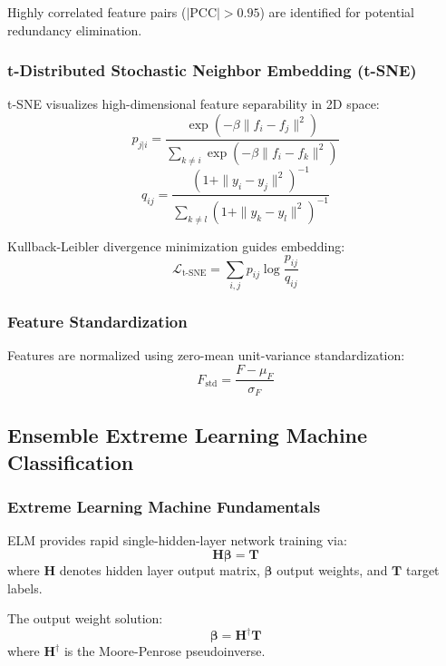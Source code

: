 \documentclass[11pt,a4paper]{article}
\begin{document}
Highly correlated feature pairs ($|\text{PCC}| > 0.95$) are identified for potential redundancy elimination.

\subsubsection{t-Distributed Stochastic Neighbor Embedding (t-SNE)}
t-SNE visualizes high-dimensional feature separability in 2D space:
\begin{equation}
p_{j|i} = \frac{\exp(-\beta \|f_i - f_j\|^2)}{\sum_{k \neq i}\exp(-\beta \|f_i - f_k\|^2)}
\end{equation}
\begin{equation}
q_{ij} = \frac{(1 + \|y_i - y_j\|^2)^{-1}}{\sum_{k \neq l}(1 + \|y_k - y_l\|^2)^{-1}}
\end{equation}

Kullback-Leibler divergence minimization guides embedding:
\begin{equation}
\mathcal{L}_{\text{t-SNE}} = \sum_{i,j} p_{ij} \log \frac{p_{ij}}{q_{ij}}
\end{equation}

\subsubsection{Feature Standardization}
Features are normalized using zero-mean unit-variance standardization:
\begin{equation}
F_{\text{std}} = \frac{F - \mu_F}{\sigma_F}
\end{equation}

\subsection{Ensemble Extreme Learning Machine Classification}

\subsubsection{Extreme Learning Machine Fundamentals}
ELM provides rapid single-hidden-layer network training via:
\begin{equation}
\mathbf{H} \boldsymbol{\beta} = \mathbf{T}
\end{equation}
where $\mathbf{H}$ denotes hidden layer output matrix, $\boldsymbol{\beta}$ output weights, and $\mathbf{T}$ target labels.

The output weight solution:
\begin{equation}
\boldsymbol{\beta} = \mathbf{H}^{\dagger} \mathbf{T}
\end{equation}
where $\mathbf{H}^{\dagger}$ is the Moore-Penrose pseudoinverse.
\end{document}
